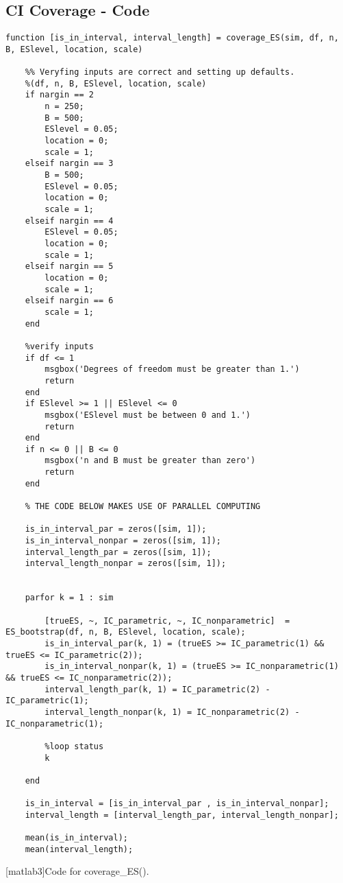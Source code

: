 \documentclass[11pt, a4paper]{article}
\begin{document}
\subsection{CI Coverage - Code}
\begin{lstlisting}[style=Matlab-editor]
function [is_in_interval, interval_length] = coverage_ES(sim, df, n, B, ESlevel, location, scale)
    
    %% Veryfing inputs are correct and setting up defaults.
    %(df, n, B, ESlevel, location, scale)
    if nargin == 2
        n = 250;
        B = 500;
        ESlevel = 0.05;
        location = 0;
        scale = 1;
    elseif nargin == 3
        B = 500;
        ESlevel = 0.05;
        location = 0;
        scale = 1;
    elseif nargin == 4
        ESlevel = 0.05;
        location = 0;
        scale = 1;
    elseif nargin == 5
        location = 0;
        scale = 1;
    elseif nargin == 6
        scale = 1;
    end

    %verify inputs
    if df <= 1
        msgbox('Degrees of freedom must be greater than 1.')
        return
    end
    if ESlevel >= 1 || ESlevel <= 0
        msgbox('ESlevel must be between 0 and 1.')
        return
    end
    if n <= 0 || B <= 0
        msgbox('n and B must be greater than zero')
        return
    end

    % THE CODE BELOW MAKES USE OF PARALLEL COMPUTING
    
    is_in_interval_par = zeros([sim, 1]);
    is_in_interval_nonpar = zeros([sim, 1]);
    interval_length_par = zeros([sim, 1]);
    interval_length_nonpar = zeros([sim, 1]);
    
    
    parfor k = 1 : sim

        [trueES, ~, IC_parametric, ~, IC_nonparametric]  = ES_bootstrap(df, n, B, ESlevel, location, scale);
        is_in_interval_par(k, 1) = (trueES >= IC_parametric(1) && trueES <= IC_parametric(2));
        is_in_interval_nonpar(k, 1) = (trueES >= IC_nonparametric(1) && trueES <= IC_nonparametric(2));       
        interval_length_par(k, 1) = IC_parametric(2) - IC_parametric(1);
        interval_length_nonpar(k, 1) = IC_nonparametric(2) - IC_nonparametric(1);
        
        %loop status
        k
    
    end
    
    is_in_interval = [is_in_interval_par , is_in_interval_nonpar];
    interval_length = [interval_length_par, interval_length_nonpar];
    
    mean(is_in_interval);
    mean(interval_length);

\end{lstlisting}
\label{matlab3}
[matlab3]{Code for coverage\_ES().}
\end{document}

